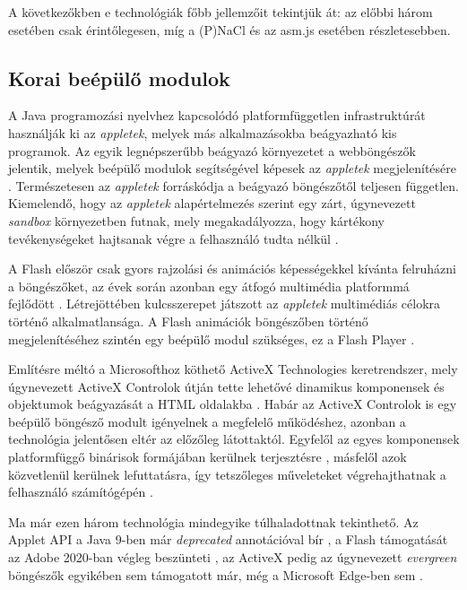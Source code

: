 A következőkben e technológiák főbb jellemzőit tekintjük át: az előbbi három esetében csak érintőlegesen, míg a (P)NaCl és az asm.js esetében részletesebben.

\subsection{Korai beépülő modulok}

A Java programozási nyelvhez kapcsolódó platformfüggetlen infrastruktúrát használják ki az \textit{appletek}, melyek más alkalmazásokba beágyazható kis programok\cite{JavaDocs::java.applet.Applet}. Az egyik legnépszerűbb beágyazó környezetet a webböngészők jelentik, melyek beépülő modulok segítségével képesek az \textit{appletek} megjelenítésére \cite{JavaPlugInTechnology}. Természetesen az \textit{appletek} forráskódja a beágyazó böngészőtől teljesen független. Kiemelendő, hogy az \textit{appletek} alapértelmezés szerint egy zárt, úgynevezett \textit{sandbox} környezetben futnak, mely megakadályozza, hogy kártékony tevékenységeket hajtsanak végre a felhasználó tudta nélkül \cite{TheJavaTutorials::JavaApplets}.

A Flash először csak gyors rajzolási és animációs képességekkel kívánta felruházni a böngészőket, az évek során azonban egy átfogó multimédia platformmá fejlődött \cite{Gay::TheHistoryOfFlash}. Létrejöttében kulcsszerepet játszott az \textit{appletek} multimédiás célokra történő alkalmatlansága. A Flash animációk böngészőben történő megjelenítéséhez szintén egy beépülő modul szükséges, ez a Flash Player \cite{AdobeFlashPlayer}.

Említésre méltó a Microsofthoz köthető ActiveX Technologies keretrendszer, mely úgynevezett ActiveX Controlok útján tette lehetővé dinamikus komponensek és objektumok beágyazását a HTML oldalakba \cite{MicrosoftAnnouncesActiveXTechnologies}. Habár az ActiveX Controlok is egy beépülő böngésző modult igényelnek a megfelelő működéshez, azonban a technológia jelentősen eltér az előzőleg látottaktól. Egyfelől az egyes komponensek platformfüggő binárisok formájában kerülnek terjesztésre \cite{Grimes::MaliciousMobileCode}, másfelől azok közvetlenül kerülnek lefuttatásra, így tetszőleges műveleteket végrehajthatnak a felhasználó számítógépén \cite{DesigningSecureActiveXControls}.

Ma már ezen három technológia mindegyike túlhaladottnak tekinthető. Az Applet API a Java 9-ben már \textit{deprecated} annotációval bír \cite{JEP289::DeprecateTheAppletAPI}, a Flash támogatását az Adobe 2020-ban végleg beszünteti \cite{FlashAndTheFutureOfInteractiveContent}, az ActiveX pedig az úgynevezett \textit{evergreen} böngészők egyikében sem támogatott már, még a Microsoft Edge-ben sem \cite{ABreakFromThePast}.

